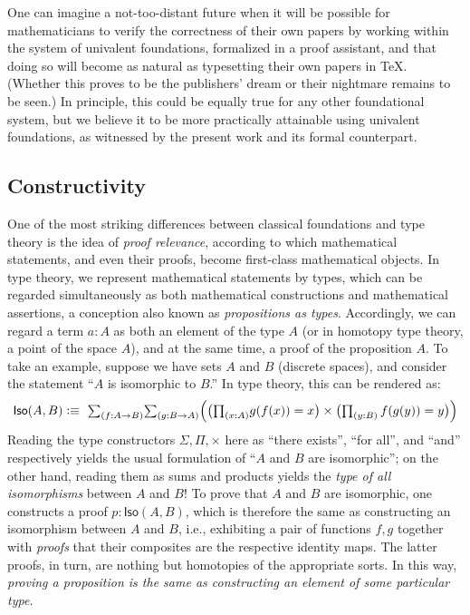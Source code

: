 One can imagine a not-too-distant future when it will be possible for mathematicians to verify the correctness of their own papers by working within the system of univalent foundations, formalized in a proof assistant, and that doing so will become as natural as typesetting their own papers in \TeX.
(Whether this proves to be the publishers' dream or their nightmare remains to be seen.) 
In principle, this could be equally true for any other foundational system, but we believe it to be more practically attainable using univalent foundations, as witnessed by the present work and its formal counterpart.

\subsection*{Constructivity} 


One of the most striking differences between classical foundations and type theory is the idea of \emph{proof relevance}, according to which mathematical statements, and even their proofs, become first-class mathematical objects.
In type theory, we represent mathematical statements by types, which can be regarded simultaneously as both mathematical constructions and mathematical assertions, a conception also known as \emph{propositions as types}.
Accordingly, we can regard a term $a : A$ as both an element of the type $A$ (or in homotopy type theory, a point of the space $A$), and at the same time, a proof of the proposition $A$.
To take an example, suppose we have sets $A$ and $B$ (discrete spaces), and consider the statement ``$A$ is isomorphic to $B$.''
In type theory, this can be rendered as:
\[
\mathsf{Iso}(A,B) \defeq\ \tsm{f : A\to B}{g : B\to A}\Bigl(\bigl(\tprd{x:A} g(f(x)) = x\bigr) \times \bigl(\tprd{y:B}\, f(g(y)) = y\bigr)\Bigr)
\]
%
Reading the type constructors $\Sigma, \Pi, \times$  here  as ``there exists'', ``for all'', and ``and'' respectively yields the usual formulation of ``$A$ and $B$ are isomorphic''; on the other hand, reading them as sums and products yields the \emph{type of all isomorphisms} between $A$ and $B$!  To prove that $A$ and $B$ are isomorphic, one  constructs a proof $p : \mathsf{Iso}(A,B)$, which is therefore the same  as constructing an isomorphism between $A$ and $B$, i.e., exhibiting a pair of functions $f, g$ together with \emph{proofs} that their composites are the respective identity maps.  The latter proofs, in turn, are nothing but homotopies of the appropriate sorts.  In this way, \emph{proving a proposition is the same as constructing an element of some particular type.}

